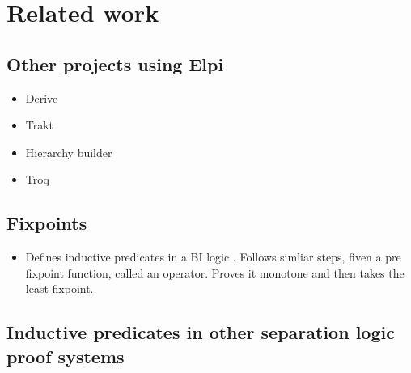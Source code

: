 \documentclass[thesis.tex]{subfiles}
\begin{document}
\VerbatimFootnotes

\chapter{Related work} \label{ch:relatedwork}

\section{Other projects using Elpi}
\begin{itemize}
    \item \cite{tassiDerivingProvedEquality2019} Derive
    \item \cite{blotCompositionalPreprocessingAutomated2023} Trakt
    \item \cite{cohenHierarchyBuilderAlgebraic2020} Hierarchy builder
    \item Troq
\end{itemize}

\section{Fixpoints}
\begin{itemize}
    \item \cite{brotherstonFormalisedInductiveReasoning2007,brotherstonCyclicProofsProgram2008} Defines inductive predicates in a BI logic . Follows simliar steps, fiven a pre fixpoint function, called an operator. Proves it monotone and then takes the least fixpoint. 
\end{itemize}

\section{Inductive predicates in other separation logic proof systems}
\end{document}
